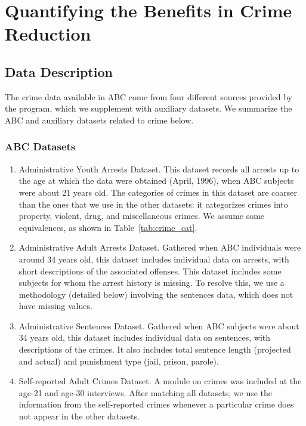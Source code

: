 \section{Quantifying the Benefits in Crime Reduction} \label{appendix:crime}

\subsection{Data Description}

\noindent The crime data available in ABC come from four different sources provided by the program, which we supplement with auxiliary datasets. We summarize the ABC and auxiliary datasets related to crime below. \\

\subsubsection{ABC Datasets}
\begin{enumerate}
\item Administrative Youth Arrests Dataset.  This dataset records all arrests up to the age at which the data were obtained (April, 1996), when ABC subjects were about 21 years old. The categories of crimes in this dataset are coarser than the ones that we use in the other datasets: it categorizes crimes into property, violent, drug, and miscellaneous crimes. We assume some equivalences, as shown in Table~\ref{tab:crime_cat}.
\item Administrative Adult Arrests Dataset. Gathered when ABC individuals were around 34 years old, this dataset includes individual data on arrests, with short descriptions of the associated offenses. This dataset includes some subjects for whom the arrest history is missing. To resolve this, we use a methodology (detailed below) involving the sentences data, which does not have missing values.
\item Administrative Sentences Dataset. Gathered when ABC subjects were about 34 years old, this dataset includes individual data on sentences, with descriptions of the crimes. It also includes total sentence length (projected and actual) and punishment type (jail, prison, parole).
\item Self-reported Adult Crimes Dataset. A module on crimes was included at the age-21 and age-30 interviews. After matching all datasets, we use the information from the self-reported crimes whenever a particular crime does not appear in the other datasets.
\end{enumerate}


